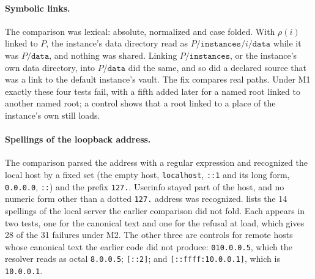 \documentclass[11pt]{article}
\theoremstyle{plain}
\theoremstyle{definition}
\theoremstyle{remark}
\begin{document}
\paragraph{Symbolic links.} The comparison was lexical: absolute, normalized and case folded. With
$\rho(i)$ linked to $P$, the instance's data directory read as $P/\texttt{instances}/i/\texttt{data}$
while it was $P/\texttt{data}$, and nothing was shared. Linking $P/\texttt{instances}$, or the
instance's own data directory, into $P/\texttt{data}$ did the same, and so did a declared source that
was a link to the default instance's vault. The fix compares real paths. Under M1 exactly these four
tests fail, with a fifth added later for a named root linked to another named root; a control shows
that a root linked to a place of the instance's own still loads.

\paragraph{Spellings of the loopback address.} The comparison parsed the address with a regular
expression and recognized the local host by a fixed set (the empty host, \texttt{localhost},
\texttt{::1} and its long form, \texttt{0.0.0.0}, \texttt{::}) and the prefix \texttt{127.}.
Userinfo stayed part of the host, and no numeric form other than a dotted \texttt{127.} address was
recognized.  lists the 14 spellings of the local server the earlier comparison
did not fold. Each appears in two tests, one for the canonical text and one for the refusal at load,
which gives 28 of the 31 failures under M2. The other three are controls for remote hosts whose
canonical text the earlier code did not produce: \texttt{010.0.0.5}, which the resolver reads as
octal \texttt{8.0.0.5}; \texttt{[::2]}; and \texttt{[::ffff:10.0.0.1]}, which is
\texttt{10.0.0.1}.
\end{document}

